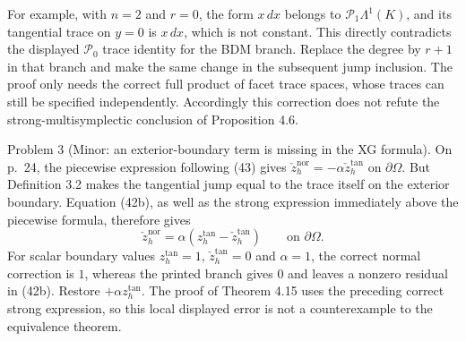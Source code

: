 \documentclass[10pt]{article}
\begin{document}
For example, with \(n=2\) and \(r=0\), the form \(x\,dx\) belongs to \(\mathcal P_1\Lambda^1(K)\), and its tangential trace on \(y=0\) is \(x\,dx\), which is not constant. This directly contradicts the displayed \(\mathcal P_0\) trace identity for the BDM branch. Replace the degree by \(r+1\) in that branch and make the same change in the subsequent jump inclusion. The proof only needs the correct full product of facet trace spaces, whose traces can still be specified independently. Accordingly this correction does not refute the strong-multisymplectic conclusion of Proposition 4.6.\par
Problem 3 (Minor: an exterior-boundary term is missing in the XG formula).  On p. 24, the piecewise expression following (43) gives \(\check z_h^\mathrm{nor}=-\alpha\check z_h^\mathrm{tan}\) on \(\partial\Omega\). But Definition 3.2 makes the tangential jump equal to the trace itself on the exterior boundary. Equation (42b), as well as the strong expression immediately above the piecewise formula, therefore gives \[\check z_h^\mathrm{nor}=\alpha(z_h^\mathrm{tan}-\check z_h^\mathrm{tan})
       \qquad\text{on }\partial\Omega.\] For scalar boundary values \(z_h^\mathrm{tan}=1\), \(\check z_h^\mathrm{tan}=0\) and \(\alpha=1\), the correct normal correction is \(1\), whereas the printed branch gives \(0\) and leaves a nonzero residual in (42b). Restore \(+\alpha z_h^\mathrm{tan}\). The proof of Theorem 4.15 uses the preceding correct strong expression, so this local displayed error is not a counterexample to the equivalence theorem.\par
\end{document}
